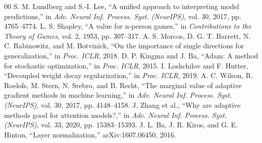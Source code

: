 \documentclass[conference]{IEEEtran}
\begin{document}
\begin{thebibliography}{00}
S. M. Lundberg and S.-I. Lee, ``A unified approach to interpreting model predictions,'' in \emph{Adv. Neural Inf. Process. Syst. (NeurIPS)}, vol. 30, 2017, pp. 4765--4774.
L. S. Shapley, ``A value for n-person games,'' in \emph{Contributions to the Theory of Games}, vol. 2, 1953, pp. 307--317.
A. S. Morcos, D. G. T. Barrett, N. C. Rabinowitz, and M. Botvinick, ``On the importance of single directions for generalization,'' in \emph{Proc. ICLR}, 2018.
D. P. Kingma and J. Ba, ``Adam: A method for stochastic optimization,'' in \emph{Proc. ICLR}, 2015.
I. Loshchilov and F. Hutter, ``Decoupled weight decay regularization,'' in \emph{Proc. ICLR}, 2019.
A. C. Wilson, R. Roelofs, M. Stern, N. Srebro, and B. Recht, ``The marginal value of adaptive gradient methods in machine learning,'' in \emph{Adv. Neural Inf. Process. Syst. (NeurIPS)}, vol. 30, 2017, pp. 4148--4158.
J. Zhang et al., ``Why are adaptive methods good for attention models?,'' in \emph{Adv. Neural Inf. Process. Syst. (NeurIPS)}, vol. 33, 2020, pp. 15383--15393.
J. L. Ba, J. R. Kiros, and G. E. Hinton, ``Layer normalization,'' arXiv:1607.06450, 2016.
\end{thebibliography}
\end{document}
